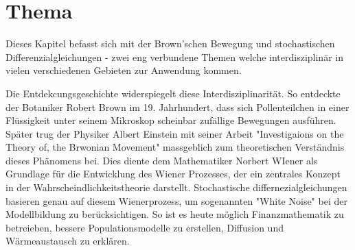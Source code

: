 %
%
%
%
\chapter{Thema\label{chapter:brown}}
\begin{refsection}

Dieses Kapitel befasst sich mit der Brown'schen Bewegung und stochastischen Differenzialgleichungen - zwei eng verbundene Themen welche interdisziplinär in vielen verschiedenen Gebieten zur Anwendung kommen. 

Die Entdekcungsgeschichte widerspiegelt diese Interdisziplinarität. So entdeckte der Botaniker Robert Brown im 19. Jahrhundert, dass sich Pollenteilchen in einer Flüssigkeit unter seinem Mikroskop scheinbar zufällige Bewegungen ausführen. Später trug der Physiker Albert Einstein mit seiner Arbeit "Investigaions on the Theory of, the Brwonian Movement" massgeblich zum theoretischen Verständnis dieses Phänomens bei. Dies diente dem Mathematiker Norbert WIener als Grundlage für die Entwicklung des Wiener Prozesses, der ein zentrales Konzept in der Wahrscheindlichkeitstheorie darstellt. Stochastische differnezialgleichungen basieren genau auf diesem Wienerprozess, um sogenannten "White Noise" bei der Modellbildung zu berücksichtigen. So ist es heute möglich Finanzmathematik zu betreieben, bessere Populationsmodelle zu erstellen, Diffusion und Wärmeaustausch zu erklären.








\printbibliography[heading=subbibliography]
\end{refsection}
